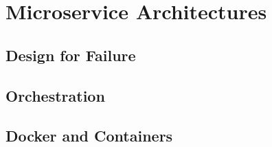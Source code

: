 \section{Microservice Architectures}
\subsection{Design for Failure}
\subsection{Orchestration}
\subsection{Docker and Containers}
